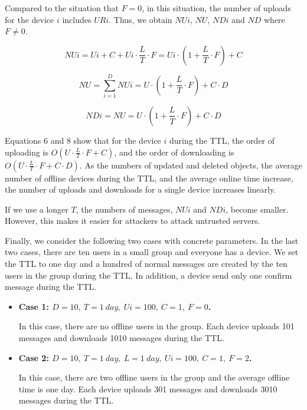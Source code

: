 \documentclass[sigconf]{acmart}
\begin{document}
Compared to the situation that $F=0$, in this situation, the number of uploads for the device $i$ includes $URi$.
Thus, we obtain $NUi$, $NU$, $NDi$ and $ND$ where $F \neq 0$.

\begin{equation}
NUi = Ui + C + Ui \cdot \frac{L}{T} \cdot F = Ui \cdot (1 + \frac{L}{T} \cdot F) + C
\end{equation}

\begin{equation}
NU = \sum_{i = 1}^{D} NUi = U \cdot (1 + \frac{L}{T} \cdot F) + C \cdot D
\end{equation}

\begin{equation}
NDi = NU = U \cdot (1 + \frac{L}{T} \cdot F) + C \cdot D
\end{equation}

Equations 6 and 8 show that for the device $i$ during the TTL, the order of uploading is $O(U \cdot \frac{L}{T} \cdot F + C)$, and the order of downloading is $O(U \cdot \frac{L}{T} \cdot F + C \cdot D)$.
As the numbers of updated and deleted objects, the average number of offline devices during the TTL, and the average online time increase, the number of uploads and downloads for a single device increases linearly.

If we use a longer $T$, the numbers of messages, $NUi$ and $NDi$, become smaller.
However, this makes it easier for attackers to attack untrusted servers.

Finally, we consider the following two cases with concrete parameters.
In the last two cases, there are ten users in a small group and everyone has a device.
We set the TTL to one day and a hundred of normal messages are created by the ten users in the group during the TTL.
In addition, a device send only one confirm message during the TTL.

\begin{itemize}
	\setlength{\itemsep}{1pt}
	\setlength{\parskip}{0pt}
	\setlength{\parsep}{0pt}
	\item \textbf{Case 1: $D = 10,\ T = 1 \ day,\ Ui = 100,\ C = 1,\ F = 0$.}
	
	In this case, there are no offline users in the group.
	Each device uploads 101 messages and downloads 1010 messages during the TTL.
	\item \textbf{Case 2: $D = 10,\ T = 1 \ day,\ L = 1 \  day,\ Ui = 100,\ C = 1,\ F = 2$.} 
	
	In this case, there are two offline users in the group and the average offline time is one day.
	Each device uploads 301 messages and downloads 3010 messages during the TTL.
\end{itemize}
\end{document}
